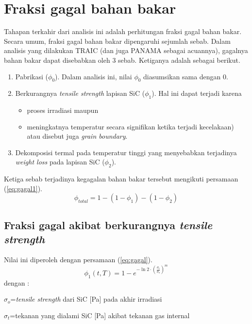 \documentclass[a4paper,11pt]{report}
\begin{document}
\section{Fraksi gagal bahan bakar}
Tahapan terkahir dari analisis ini adalah perhitungan fraksi gagal bahan bakar. Secara umum, fraksi gagal bahan bakar dipengaruhi sejumlah sebab. Dalam analisis yang dilakukan TRAIC (dan juga PANAMA sebagai acuannya), gagalnya bahan bakar dapat disebabkan oleh 3 sebab. Ketiganya adalah sebagai berikut.
\begin{enumerate}
\item Pabrikasi ($\phi_0$). Dalam analisis ini, nilai $\phi_0$ diasumsikan sama dengan $0$.
\item Berkurangnya \textit{tensile strength} lapisan SiC ($\phi_1$). Hal ini dapat terjadi karena
\begin{itemize}
\item proses irradiasi maupun
\item meningkatnya temperatur secara signifikan ketika terjadi kecelakaan) atau disebut juga \textit{grain boundary}.
\end{itemize}  
\item Dekomposisi termal pada temperatur tinggi yang menyebabkan terjadinya \textit{weight loss} pada lapisan SiC ($\phi_2$).
\end{enumerate}

Ketiga sebab terjadinya kegagalan bahan bakar tersebut mengikuti persamaan (\ref{eq:gagal1}).
\begin{equation}
  \phi_{total}=1-(1-\phi_1) -(1-\phi_2)
  \label{eq:gagal1}
\end{equation}

\subsection{Fraksi gagal akibat berkurangnya \textit{tensile strength}}
Nilai ini diperoleh dengan persamaan (\ref{eq:gagal}).
\begin{equation}
  \phi_1(t,T)=1-e^{-\ln 2 \cdot \left(\frac{\sigma_t}{\sigma_o}\right)^m}
  \label{eq:gagal}
\end{equation}
dengan :
\begin{description}
  \item $\sigma_o$=\textit{tensile strength} dari SiC [Pa] pada akhir irradiasi
  \item $\sigma_t$=tekanan yang dialami SiC [Pa] akibat tekanan gas internal
\end{description}
\end{document}
